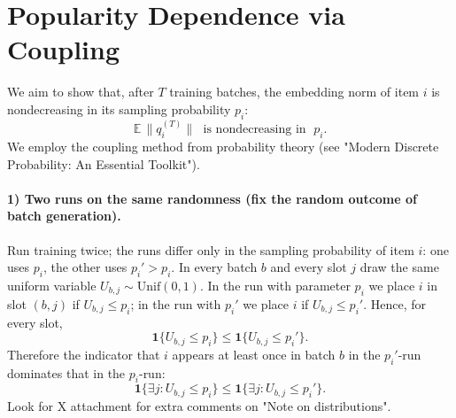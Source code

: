 \section{Popularity Dependence via Coupling}
\label{app:popularity-dependence}

We aim to show that, after $T$ training batches, the embedding norm of item $i$ is nondecreasing in its sampling probability $p_i$:
\begin{equation}
\mathbb E\,\bigl\|q_i^{(T)}\bigr\| \;\text{ is nondecreasing in }\; p_i.
\end{equation}
We employ the coupling method from probability theory (see "Modern Discrete Probability: An Essential Toolkit").

\paragraph{1) Two runs on the same randomness (fix the random outcome of batch generation).}
Run training twice; the runs differ only in the sampling probability of item $i$: one uses $p_i$, the other uses $p_i' > p_i$. In every batch $b$ and every slot $j$ draw the same uniform variable $U_{b,j} \sim \mathrm{Unif}(0, 1)$. In the run with parameter $p_i$ we place $i$ in slot $(b, j)$ if $U_{b,j} \le p_i$; in the run with $p_i'$ we place $i$ if $U_{b,j} \le p_i'$. Hence, for every slot,
\begin{equation}
\mathbf 1\{U_{b,j} \le p_i\} \le \mathbf 1\{U_{b,j} \le p_i'\}.
\end{equation}
Therefore the indicator that $i$ appears at least once in batch $b$ in the $p_i'$-run dominates that in the $p_i$-run:
\begin{equation}
\mathbf 1\{\exists j : U_{b,j} \le p_i\} \le \mathbf 1\{\exists j : U_{b,j} \le p_i'\}.
\end{equation}
Look for X attachment for extra comments on "Note on distributions".

